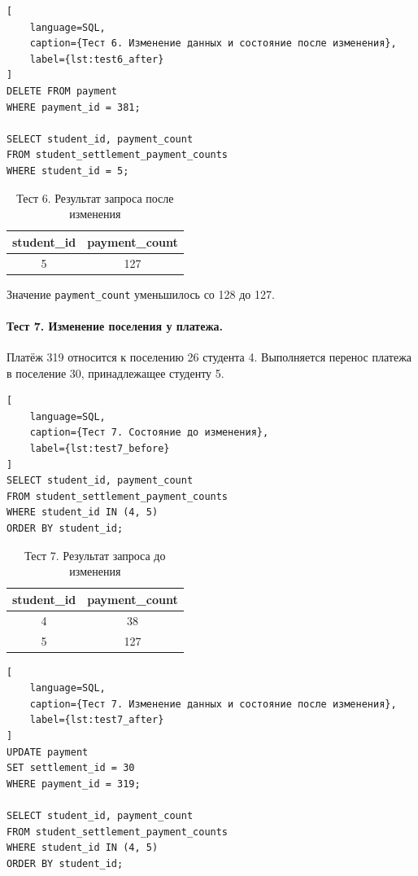\begin{lstlisting}[
    language=SQL,
    caption={Тест 6. Изменение данных и состояние после изменения},
    label={lst:test6_after}
]
DELETE FROM payment
WHERE payment_id = 381;

SELECT student_id, payment_count
FROM student_settlement_payment_counts
WHERE student_id = 5;
\end{lstlisting}

\begin{table}[H]
\centering
\caption{Тест 6. Результат запроса после изменения}
\label{tab:test6_after}
\small
\begin{tabular}{|c|c|}
\hline
\textbf{student\_id} & \textbf{payment\_count} \\ \hline
5 & 127 \\ \hline
\end{tabular}
\end{table}

Значение \texttt{payment\_count} уменьшилось со 128 до 127.

\paragraph{Тест 7. Изменение поселения у платежа.}
Платёж 319 относится к поселению 26 студента 4. Выполняется перенос платежа в поселение 30, принадлежащее студенту 5.

\begin{lstlisting}[
    language=SQL,
    caption={Тест 7. Состояние до изменения},
    label={lst:test7_before}
]
SELECT student_id, payment_count
FROM student_settlement_payment_counts
WHERE student_id IN (4, 5)
ORDER BY student_id;
\end{lstlisting}

\begin{table}[H]
\centering
\caption{Тест 7. Результат запроса до изменения}
\label{tab:test7_before}
\small
\begin{tabular}{|c|c|}
\hline
\textbf{student\_id} & \textbf{payment\_count} \\ \hline
4 & 38 \\ \hline
5 & 127 \\ \hline
\end{tabular}
\end{table}

\begin{lstlisting}[
    language=SQL,
    caption={Тест 7. Изменение данных и состояние после изменения},
    label={lst:test7_after}
]
UPDATE payment
SET settlement_id = 30
WHERE payment_id = 319;

SELECT student_id, payment_count
FROM student_settlement_payment_counts
WHERE student_id IN (4, 5)
ORDER BY student_id;
\end{lstlisting}

